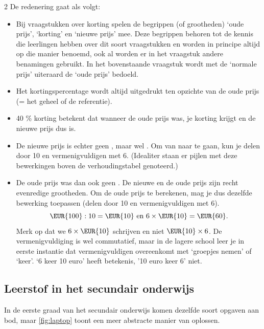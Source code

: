 \begin{multicols}{2}
De redenering gaat als volgt:

\begin{itemize}
\item Bij vraagstukken over korting spelen de begrippen (of grootheden) `oude prijs', `korting' en `nieuwe prijs' mee.
Deze begrippen behoren tot de kennis die leerlingen hebben over dit soort vraagstukken en worden in principe altijd op die manier benoemd, ook al worden er in het vraagstuk andere benamingen gebruikt.
In het bovenstaande vraagstuk wordt met de `normale prijs' uiteraard de `oude prijs' bedoeld.
\item Het kortingspercentage wordt altijd uitgedrukt ten opzichte van de oude prijs (= het geheel of de referentie).
\item 40 \% korting betekent dat wanneer de oude prijs  was, je  korting krijgt en de nieuwe prijs dus  is.
\item De nieuwe prijs is echter geen , maar wel .
Om van  naar  te gaan, kun je delen door 10 en vermenigvuldigen met 6.
(Idealiter staan er pijlen met deze bewerkingen boven de verhoudingstabel genoteerd.)
\item De oude prijs was dan ook geen .
De nieuwe en de oude prijs zijn recht evenredige grootheden.
Om de oude prijs te berekenen, mag je dus dezelfde bewerking toepassen (delen door 10 en vermenigvuldigen met 6).
\[
\EUR{100} : 10 = \EUR{10} \text{ en } 6 \times \EUR{10} = \EUR{60}.
\]
Merk op dat we \(6 \times \EUR{10}\) schrijven en niet \(\EUR{10} \times 6\).
De vermenigvuldiging is wel commutatief, maar in de lagere school leer je in eerste instantie dat vermenigvuldigen overeenkomt met `groepjes nemen' of `keer'.
`6 keer 10 euro' heeft betekenis, '10 euro keer 6' niet.
\end{itemize}

\subsection{Leerstof in het secundair onderwijs}

In de eerste graad van het secundair onderwijs komen dezelfde soort opgaven aan bod, maar \autoref{fig:laptop} toont een meer abstracte manier van oplossen.

\end{multicols}

